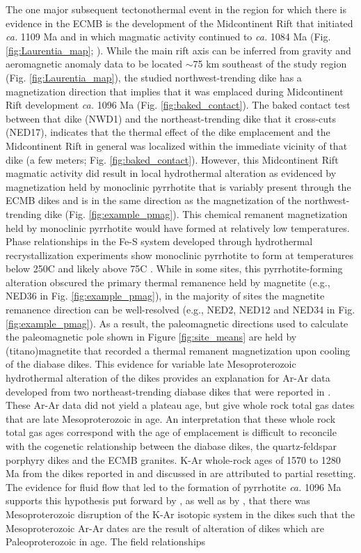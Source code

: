 \documentclass[draft]{agujournal2019}
\begin{document}
The one major subsequent tectonothermal event in the region for which there is evidence in the ECMB is the development of the Midcontinent Rift that initiated \textit{ca.} 1109 Ma and in which magmatic activity continued to \textit{ca.} 1084 Ma (Fig. \ref{fig:Laurentia_map}; ). While the main rift axis can be inferred from gravity and aeromagnetic anomaly data to be located $\sim$75 km southeast of the study region (Fig. \ref{fig:Laurentia_map}), the studied northwest-trending dike has a magnetization direction that implies that it was emplaced during Midcontinent Rift development \textit{ca.} 1096 Ma (Fig. \ref{fig:baked_contact}). The baked contact test between that dike (NWD1) and the northeast-trending dike that it cross-cuts (NED17), indicates that the thermal effect of the dike emplacement and the Midcontinent Rift in general was localized within the immediate vicinity of that dike (a few meters; Fig. \ref{fig:baked_contact}). However, this Midcontinent Rift magmatic activity did result in local hydrothermal alteration as evidenced by magnetization held by monoclinic pyrrhotite that is variably present through the ECMB dikes and is in the same direction as the magnetization of the northwest-trending dike (Fig. \ref{fig:example_pmag}). This chemical remanent magnetization held by monoclinic pyrrhotite would have formed at relatively low temperatures. Phase relationships in the Fe-S system developed through hydrothermal recrystallization experiments show monoclinic pyrrhotite to form at temperatures below 250\textdegree C and likely above 75\textdegree C \cite{Kissin1982a}. While in some sites, this pyrrhotite-forming alteration obscured the primary thermal remanence held by magnetite (e.g., NED36 in Fig. \ref{fig:example_pmag}), in the majority of sites the magnetite remanence direction can be well-resolved (e.g., NED2, NED12 and NED34 in Fig. \ref{fig:example_pmag}). As a result, the paleomagnetic directions used to calculate the paleomagnetic pole shown in Figure \ref{fig:site_means} are held by (titano)magnetite that recorded a thermal remanent magnetization upon cooling of the diabase dikes. This evidence for variable late Mesoproterozoic hydrothermal alteration of the dikes provides an explanation for Ar-Ar data developed from two northeast-trending diabase dikes that were reported in . These Ar-Ar data did not yield a plateau age, but give whole rock total gas dates that are late Mesoproterozoic in age. An interpretation that these whole rock total gas ages correspond with the age of emplacement is difficult to reconcile with the cogenetic relationship between the diabase dikes, the quartz-feldspar porphyry dikes and the ECMB granites. K-Ar whole-rock ages of 1570 to 1280 Ma from the dikes reported in  and discussed in  are attributed to partial resetting. The evidence for fluid flow that led to the formation of pyrrhotite \textit{ca.} 1096 Ma supports this hypothesis put forward by , as well as by , that there was Mesoproterozoic disruption of the K-Ar isotopic system in the dikes such that the Mesoproterozoic Ar-Ar dates are the result of alteration of dikes which are Paleoproterozoic in age. The field relationships 
\end{document}
